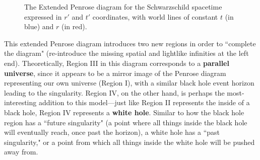 \documentclass{article}
\def\R{0.25} %
\def\e{0.25} %
\def\ang{45} %
\def\angb{acos(sqrt(\e)*sin(\ang))} %
\def\a{\R*sin(\ang)*sqrt(1-\e*sin(\ang)^2)/(1-\e*sin(\ang)^2)} %
\def\b{\R*sqrt(\e)*sin(\ang)*cos(\ang)/(1-\e*sin(\ang)^2)} %
\def\conefront#1{ %
  \draw[cone] %
    (#1) --++ (45:\R) arc({\angb-90}:{-90-\angb}:{\a} and {\b})
     --++ (-45:2*\R) arc({90-\angb}:{-270+\angb}:{\a} and {\b}) -- cycle;
}
\begin{document}
\begin{figure}[ht]
\begin{center}
\end{center}



\caption{The Extended Penrose diagram for the Schwarzschild spacetime expressed in $r'$ and $t'$ coordinates, with world lines of constant $t$ (in blue) and $r$ (in red).}
\label{fig:penrose_schwarz_ext}
\end{figure}

This extended Penrose diagram introduces two new regions in order to ``complete the diagram" (re-introduce the missing spatial and lightlike infinities at the left end). Theoretically, Region III in this diagram corresponds to a \textbf{parallel universe}, since it appears to be a mirror image of the Penrose diagram representing our own universe (Region I), with a similar black hole event horizon leading to the singularity. Region IV, on the other hand, is perhaps the most-interesting addition to this model---just like Region II represents the inside of a black hole, Region IV represents a \textbf{white hole}. Similar to how the black hole region has a ``future singularity" (a point where all things inside the black hole will eventually reach, once past the horizon), a white hole has a ``past singularity," or a point from which all things inside the white hole will be pushed away from. 
\end{document}
